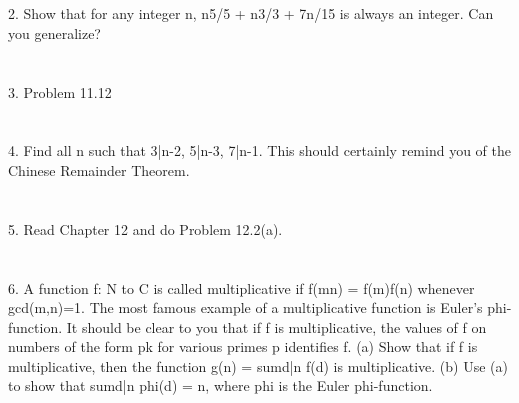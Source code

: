 \documentclass[letterpaper, 12pt, oneside]{memoir}
\theoremstyle{mystyle}
\begin{document}
\section{} 
2. Show that for any integer n, n5/5 + n3/3 + 7n/15 is always an integer. Can you generalize?

\section{} 
3. Problem 11.12
\section{} 
4. Find all n such that  3|n-2, 5|n-3, 7|n-1. This should certainly remind you of the Chinese Remainder Theorem. 
\section{} 
5. Read Chapter 12 and do Problem 12.2(a). 
\section{} 
6. A function f: N to C is called multiplicative if f(mn) = f(m)f(n) whenever gcd(m,n)=1. The most famous example of a multiplicative function is Euler's phi-function. It should be clear to you that if f is multiplicative, the values of f on numbers of the form pk for various primes p identifies f. 
(a) Show that if f is multiplicative, then the function g(n) = sumd|n f(d) is multiplicative. 
(b) Use (a) to show that sumd|n phi(d) = n, where phi is the Euler phi-function. 
\end{document}
